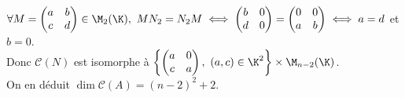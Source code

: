 \documentclass[8pt]{book}
\begin{document}
	$\forall M=\begin{pmatrix}
		a&b\\
		c&d
	\end{pmatrix}\in \M_2(\K),\ MN_2=N_2M\iff \begin{pmatrix}
	b&0\\
	d&0
	\end{pmatrix}=\begin{pmatrix}
	0&0\\
	a&b
	\end{pmatrix}\iff a=d$ et $b=0$.\\
	Donc $\mathcal C(N)$ est isomorphe à $\left\{\begin{pmatrix}
		a&0\\
		c&a
	\end{pmatrix},\ (a,c)\in \K^2\right\}\times\M_{n-2}(\K)$.\\
	On en déduit $\dim\mathcal C(A)=(n-2)^2+2$.
	
\end{document}
